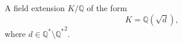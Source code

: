 A field extension  $ K/ \mathbb{Q} $  of the form
 \[K= \mathbb{Q}( \sqrt{d}), \] where  
$ d \in  \mathbb{Q}^* \setminus { \mathbb{Q}^*}^2 . $ 

